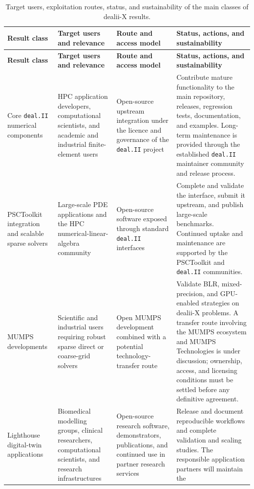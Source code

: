 \documentclass[a4paper,12pt]{article}
\begin{document}
\begingroup
\footnotesize
\renewcommand{\arraystretch}{1.15}
\begin{longtable}{|p{2.4cm}|p{2.9cm}|p{3.1cm}|p{4.2cm}|}
\caption{Target users, exploitation routes, status, and sustainability of the
main classes of dealii-X results.}
\label{tab:exploitation_routes}\\
\hline
\textbf{Result class} & \textbf{Target users and relevance} &
\textbf{Route and access model} & \textbf{Status, actions, and sustainability} \\
\hline
\endfirsthead
\hline
\textbf{Result class} & \textbf{Target users and relevance} &
\textbf{Route and access model} & \textbf{Status, actions, and sustainability} \\
\hline
\endhead
Core \texttt{deal.II} numerical components &
HPC application developers, computational scientists, and academic and
industrial finite-element users &
Open-source upstream integration under the licence and governance of the
\texttt{deal.II} project &
Contribute mature functionality to the main repository, releases, regression
tests, documentation, and examples. Long-term maintenance is provided through
the established \texttt{deal.II} maintainer community and release process. \\
\hline
PSCToolkit integration and scalable sparse solvers &
Large-scale PDE applications and the HPC numerical-linear-algebra community &
Open-source software exposed through standard \texttt{deal.II} interfaces &
Complete and validate the interface, submit it upstream, and publish
large-scale benchmarks. Continued uptake and maintenance are supported by the
PSCToolkit and \texttt{deal.II} communities. \\
\hline
MUMPS developments &
Scientific and industrial users requiring robust sparse direct or coarse-grid
solvers &
Open MUMPS development combined with a potential technology-transfer route &
Validate BLR, mixed-precision, and GPU-enabled strategies on dealii-X
problems. A transfer route involving the MUMPS ecosystem and MUMPS
Technologies is under discussion; ownership, access, and licensing conditions
must be settled before any definitive agreement. \\
\hline
Lighthouse digital-twin applications &
Biomedical modelling groups, clinical researchers, computational scientists,
and research infrastructures &
Open-source research software, demonstrators, publications, and continued use
in partner research services &
Release and document reproducible workflows and complete validation and
scaling studies. The responsible application partners will maintain the

\end{longtable}
\end{document}
